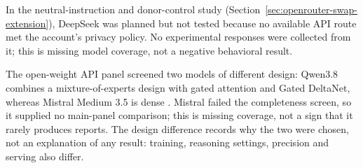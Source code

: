 \documentclass[11pt]{article}
\begin{document}
In the neutral-instruction and donor-control study
(Section~\ref{sec:openrouter-swap-extension}), DeepSeek was planned but not
tested because no available API route met the account's privacy policy.
No experimental responses were collected from it; this is missing model
coverage, not a negative behavioral result.

The open-weight API panel screened two models of different design: Qwen3.8
combines a mixture-of-experts design with gated attention and Gated DeltaNet,
whereas Mistral Medium 3.5 is dense \citep{qwen2026modelcard,mistral2026medium}.
Mistral failed the completeness screen, so it supplied no main-panel
comparison; this is missing coverage, not a sign that it rarely produces
reports. The design difference records why the two were chosen, not an
explanation of any result: training, reasoning settings, precision and
serving also differ.
\end{document}

